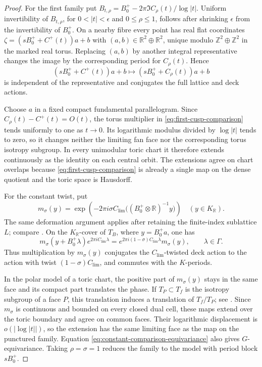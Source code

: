 \documentclass[11pt]{article}
\theoremstyle{definition}
\theoremstyle{remark}
\numberwithin{equation}{section}
\begin{document}
\begin{proof}
For the first family put
$B_{t,\rho}=B_0^+-2\pi\Im C_\rho(t)/\log|t|$.
Uniform invertibility of $B_{t,\rho}$, for $0<|t|<\epsilon$ and
$0\leq\rho\leq1$, follows after shrinking $\epsilon$ from the
invertibility of $B_0^+$.  On a nearby fibre every point has real flat
coordinates
$
 \zeta=(sB_0^++C^+(t))a+b
$
with $(a,b)\in\mathbb R^2\oplus\mathbb R^2$, unique modulo
$\mathbb Z^2\oplus\mathbb Z^2$ in the marked real torus.  Replacing
$(a,b)$ by another integral representative changes the image by the
corresponding period for $C_\rho(t)$.  Hence
\begin{equation}\label{eq:first-cusp-comparison}
 (sB_0^++C^+(t))a+b\longmapsto
 (sB_0^++C_\rho(t))a+b
\end{equation}
is independent of the representative and conjugates the full lattice and
deck actions.

Choose $a$ in a fixed compact fundamental parallelogram.  Since
$C_\rho(t)-C^+(t)=O(t)$, the torus multiplier in
\eqref{eq:first-cusp-comparison} tends uniformly to one as $t\to0$.  Its
logarithmic modulus divided by $\log|t|$ tends to
zero, so it changes neither the limiting fan face nor the corresponding
torus isotropy subgroup.  In every unimodular toric chart it therefore extends continuously
as the identity on each central orbit.  The extensions agree on chart
overlaps because \eqref{eq:first-cusp-comparison} is already a single map on the
dense quotient and the toric space is Hausdorff.

For the constant twist, put
\[
 m_\sigma(y)=\exp\!\left(
 -2\pi i\sigma C_{\mathrm{lim}}
 \bigl((B_0^+\otimes\mathbb R)^{-1}y\bigr)\right)
 \quad(y\in K_{\mathbb R}).
\]
The same deformation argument applies after retaining the finite-index
sublattice $L$; compare \citep[Lemmas~7.5--7.10]{Alpoge2026}.  On the
$K_{\mathbb R}$-cover of $T_B$, where $y=B_0^+a$, one has
\begin{equation}\label{eq:constant-comparison-equivariance}
 m_\sigma(y+B_0^+\lambda)e^{2\pi iC_{\mathrm{lim}}\lambda}
 =e^{2\pi i(1-\sigma)C_{\mathrm{lim}}\lambda}m_\sigma(y),
 \qquad \lambda\in\Gamma.
\end{equation}
Thus multiplication by $m_\sigma(y)$ conjugates the
$C_{\mathrm{lim}}$-twisted deck action to the action with twist
$(1-\sigma)C_{\mathrm{lim}}$, and commutes with the $K$-periods.

In the polar model of a toric chart, the positive part of $m_\sigma(y)$
stays in the same face and its compact part translates the phase.  If
$T_P\subset T_f$ is the isotropy subgroup of a face $P$, this
translation induces a translation of $T_f/T_P$; see
\citep[Proposition~3.1]{NakayamaOgus2010}.  Since $m_\sigma$ is continuous
and bounded on every closed dual cell, these maps extend over the toric
boundary and agree on common faces.  Their logarithmic displacement is
$o(|\log|t||)$, so the extension has the same limiting face as the
map on the punctured family.  Equation
\eqref{eq:constant-comparison-equivariance} also gives $G$-equivariance.
Taking $\rho=\sigma=1$ reduces the family to the
model with period block $sB_0^+$.
\end{proof}
\end{document}
